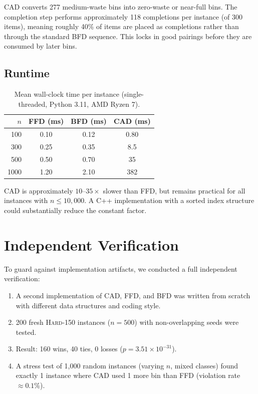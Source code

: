 \documentclass[11pt]{article}
\begin{document}
CAD converts 277 medium-waste bins into zero-waste or near-full bins. The completion
step performs approximately 118 completions per instance (of 300 items), meaning roughly
40\% of items are placed as completions rather than through the standard BFD sequence.
This locks in good pairings before they are consumed by later bins.

\subsection{Runtime}

\begin{table}[h]
\centering
\caption{Mean wall-clock time per instance (single-threaded, Python 3.11, AMD Ryzen 7).}
\label{tab:runtime}
\begin{tabular}{rccc}
\toprule
$n$ & FFD (ms) & BFD (ms) & CAD (ms) \\
\midrule
100  & 0.10 & 0.12 & 0.80 \\
300  & 0.25 & 0.35 & 8.5 \\
500  & 0.50 & 0.70 & 35 \\
1000 & 1.20 & 2.10 & 382 \\
\bottomrule
\end{tabular}
\end{table}

CAD is approximately $10$--$35\times$ slower than FFD, but remains practical for
all instances with $n \leq 10{,}000$. A C++ implementation with a sorted
index structure could substantially reduce the constant factor.

\section{Independent Verification}

To guard against implementation artifacts, we conducted a full independent verification:
\begin{enumerate}[nosep]
  \item A second implementation of CAD, FFD, and BFD was written from scratch with
        different data structures and coding style.
  \item 200 fresh \textsc{Hard-150} instances ($n = 500$) with non-overlapping seeds were tested.
  \item Result: 160 wins, 40 ties, 0 losses ($p = 3.51 \times 10^{-31}$).
  \item A stress test of 1{,}000 random instances (varying $n$, mixed classes) found
        exactly 1 instance where CAD used 1 more bin than FFD (violation rate $\approx 0.1\%$).
\end{enumerate}
\end{document}
